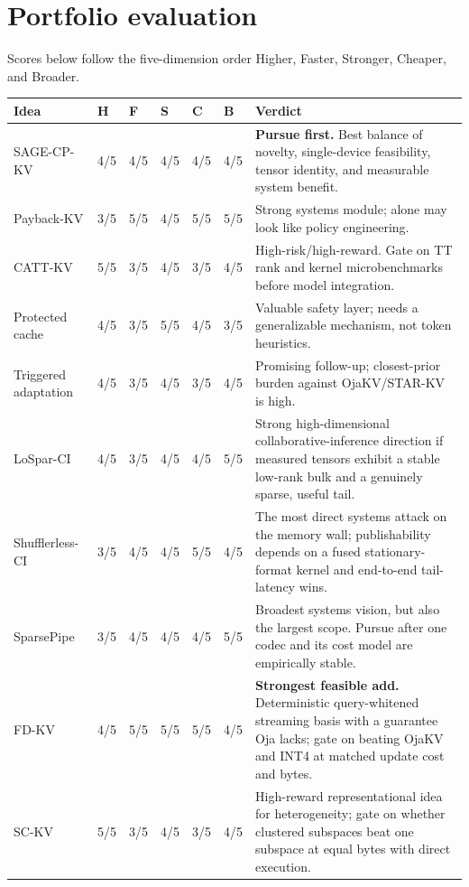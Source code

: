 \documentclass[10pt]{article}
\begin{document}
\section{Portfolio evaluation}

Scores below follow the five-dimension order Higher, Faster, Stronger, Cheaper, and Broader.

\small
\renewcommand{\arraystretch}{1.17}
\begin{tabularx}{\textwidth}{@{}p{2.45cm}p{1.05cm}p{1.05cm}p{1.05cm}p{1.05cm}p{1.05cm}X@{}}
\toprule
\textbf{Idea} & \textbf{H} & \textbf{F} & \textbf{S} & \textbf{C} &
\textbf{B} & \textbf{Verdict} \\
\midrule
SAGE-CP-KV & 4/5 & 4/5 & 4/5 & 4/5 & 4/5 & \textbf{Pursue first.} Best balance of novelty,
single-device feasibility, tensor identity, and measurable system benefit. \\
Payback-KV & 3/5 & 5/5 & 4/5 & 5/5 & 5/5 & Strong systems module; alone may look like policy
engineering. \\
CATT-KV & 5/5 & 3/5 & 4/5 & 3/5 & 4/5 & High-risk/high-reward. Gate on TT rank and kernel
microbenchmarks before model integration. \\
Protected cache & 4/5 & 3/5 & 5/5 & 4/5 & 3/5 & Valuable safety layer; needs a generalizable
mechanism, not token heuristics. \\
Triggered adaptation & 4/5 & 3/5 & 4/5 & 3/5 & 4/5 & Promising follow-up; closest-prior burden
against OjaKV/STAR-KV is high. \\
LoSpar-CI & 4/5 & 3/5 & 4/5 & 4/5 & 5/5 & Strong high-dimensional collaborative-inference
direction if measured tensors exhibit a stable low-rank bulk and a genuinely sparse, useful tail. \\
Shufflerless-CI & 3/5 & 4/5 & 4/5 & 5/5 & 4/5 & The most direct systems attack on the memory
wall; publishability depends on a fused stationary-format kernel and end-to-end tail-latency wins. \\
SparsePipe & 3/5 & 4/5 & 4/5 & 4/5 & 5/5 & Broadest systems vision, but also the largest
scope. Pursue after one codec and its cost model are empirically stable. \\
\midrule
FD-KV & 4/5 & 5/5 & 5/5 & 5/5 & 4/5 & \textbf{Strongest feasible add.} Deterministic
query-whitened streaming basis with a guarantee Oja lacks; gate on beating OjaKV and INT4 at
matched update cost and bytes. \\
SC-KV & 5/5 & 3/5 & 4/5 & 3/5 & 4/5 & High-reward representational idea for heterogeneity; gate on
whether clustered subspaces beat one subspace at equal bytes with direct execution. \\
\bottomrule
\end{tabularx}
\normalsize
\end{document}
